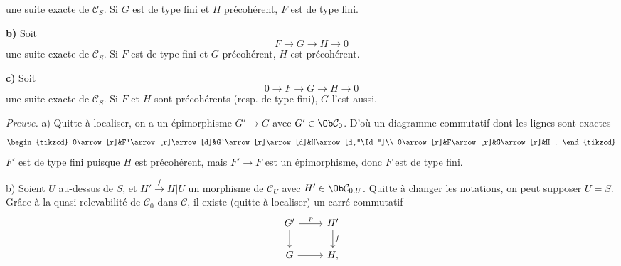 une
suite exacte de \(\mathcal C_S\). Si \(G\) est de type fini et \(H\) précohérent, \(F\) est de type fini.

\textbf{b)} Soit
\[
  F\longrightarrow G\longrightarrow H\longrightarrow 0
\]
une suite exacte de \(\mathcal C_S\). Si \(F\) est de type fini et \(G\) précohérent, \(H\) est précohérent.

\textbf{c)} Soit
\[
  0\longrightarrow F\longrightarrow G\longrightarrow H\longrightarrow 0
\]
une suite exacte de \(\mathcal C_S\). Si \(F\) et \(H\) sont précohérents (resp. de type fini), \(G\) l'est aussi.

\emph{Preuve.} a) Quitte à localiser, on a un épimorphisme \(G'\to G\) avec \(G'\in\Ob\mathcal C_0\). D'où un diagramme commutatif dont les lignes sont exactes
\[
\begin{tikzcd}
0\arrow[r]&F'\arrow[r]\arrow[d]&G'\arrow[r]\arrow[d]&H\arrow[d,"\Id"]\\
0\arrow[r]&F\arrow[r]&G\arrow[r]&H .
\end{tikzcd}
\]
\(F'\) est de type fini puisque \(H\) est précohérent, mais \(F'\to F\) est un épimorphisme, donc \(F\) est de type fini.

b) Soient \(U\) au-dessus de \(S\), et \(H'\xrightarrow{f}H|U\) un morphisme de \(\mathcal C_U\) avec \(H'\in\Ob\mathcal C_{0,U}\). Quitte à changer les notations, on peut supposer \(U=S\). Grâce à la quasi-relevabilité de \(\mathcal C_0\) dans \(\mathcal C\), il existe (quitte à localiser) un carré commutatif
\[
\begin{tikzcd}
G' \arrow[r,"p"] \arrow[d] & H' \arrow[d,"f"]\\
G \arrow[r] & H,
\end{tikzcd}
\]

